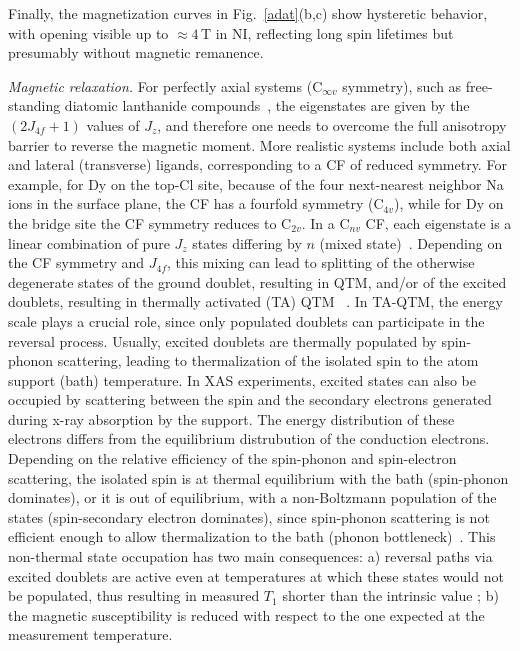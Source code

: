 {Finally, the magnetization curves in Fig.~\ref{adat}(b,c) show hysteretic behavior, with opening visible up to $\approx 4$\,T in NI, reflecting long spin lifetimes but presumably without magnetic remanence.

\textit{Magnetic relaxation.}\textemdash
For perfectly axial systems (C$_{\infty v}$ symmetry), such as free-standing diatomic lanthanide compounds~\cite{ung11, zha20}, the  eigenstates are given by the $(2J_{4f}+1)$ values of $J_z$, and therefore one needs to overcome the full anisotropy barrier to reverse the magnetic moment. More realistic systems include both axial and lateral (transverse) ligands, corresponding to a CF of reduced symmetry. For example, for Dy on the top-Cl site, because of the four  next-nearest neighbor Na ions in the surface plane, the CF has a fourfold symmetry (C$_{4v}$), while for Dy on the bridge site the CF symmetry reduces to C$_{2v}$. In a C$_{nv}$ CF, each eigenstate is a linear combination of pure $J_z$ states differing by $n$ (mixed state)~\cite{hub14}. Depending on the CF symmetry and $J_{4f}$, this mixing can lead to splitting of the otherwise degenerate states of the ground doublet, resulting in QTM, and/or of the excited doublets, resulting in thermally activated (TA) QTM ~\cite{fri96, tho96, gar97}. In TA-QTM, the energy scale plays a crucial role, since only populated doublets can participate in the reversal process. Usually, excited doublets are thermally populated by spin-phonon scattering, leading to thermalization of the isolated spin to the atom support (bath) temperature. In XAS experiments, excited states can also be occupied by scattering between the spin and the secondary electrons generated during x-ray absorption by the support. The energy distribution of these electrons differs from the equilibrium distrubution of the conduction electrons. Depending on the relative efficiency of the spin-phonon and spin-electron scattering, the isolated spin is at thermal equilibrium with the bath (spin-phonon dominates), or it is out of equilibrium, with a non-Boltzmann population of the states (spin-secondary electron dominates), since spin-phonon scattering is  not efficient enough to allow thermalization to the bath  (phonon bottleneck)~\cite{vanv41, sto65, ste67, gil75, chi00, bil21thesis}.  This non-thermal state occupation has two main consequences: a) reversal paths via excited doublets are active even at temperatures at which these states would not be populated, thus resulting in measured $T_1$ shorter than the intrinsic value \cite{don20}; b) the magnetic susceptibility is reduced with respect to the one expected at the measurement temperature.

}
